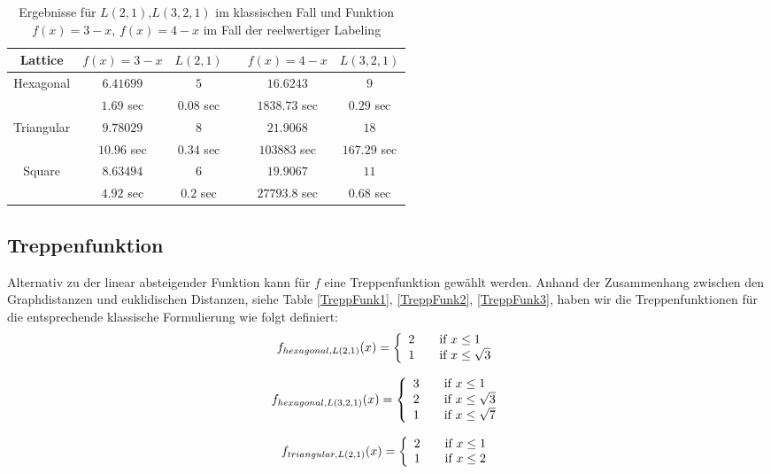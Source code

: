 \documentclass[
	fontsize=12pt,
	paper=a4,
	twoside=false,
	numbers=noenddot,
	plainheadsepline,
	toc=listof,
	toc=bibliography
]{scrartcl}
\begin{document}
\begin{table}[htbp]
\centering
  \begin{tabular}{|c|c|c| c|c|c|}
  \hline Lattice & $f(x) =3-x$  & $L(2,1)$ & & $f(x) =4-x$  & $L(3,2,1)$\\ \hline 
    Hexagonal & $6.41699$ & $5$ & &  $16.6243$ & $9$ \\ 
			& $1.69$ sec & $0.08$ sec& & $1838.73$ sec	& $0.29$ sec\\ \hline
	Triangular & $9.78029$ & $8$ & & $21.9068$ & $18$ \\
			& $10.96$ sec	& $0.34$ sec& & $103883$ sec & $167.29$ sec\\ \hline
    Square	& $8.63494$ & $6$ & & $19.9067$ & $11$ \\
			& $4.92$ sec & $0.2$ sec & & $27793.8$ sec & $0.68$ sec\\
  \hline
  \end{tabular}
\caption{Ergebnisse für  $L(2,1)$,$L(3,2,1)$ im klassischen Fall und Funktion $f(x)=3-x$, $f(x)=4-x$ im Fall der reelwertiger Labeling }
\label{Table:Table1}
\end{table}

\subsection{Treppenfunktion}

Alternativ zu der linear absteigender Funktion kann für $f$ eine Treppenfunktion gewählt werden. Anhand der Zusammenhang zwischen den Graphdistanzen und euklidischen Distanzen,
siehe Table \ref{TreppFunk1}, \ref{TreppFunk2}, \ref{TreppFunk3}, haben wir die Treppenfunktionen für die entsprechende klassische Formulierung wie folgt definiert:
\[ f_{hexagonal,L(2,1)}(x) = \left\{
  \begin{array}{l l}
    2 & \quad \text{if $x\le 1$}\\
    1 & \quad \text{if $x\le \sqrt{3}$}
  \end{array} \right.\]

\[ f_{hexagonal,L(3,2,1)}(x) = \left\{
  \begin{array}{l l}
    3 & \quad \text{if $x\le 1$}\\
    2 & \quad \text{if $x\le \sqrt{3}$}\\
    1 & \quad \text{if $x\le \sqrt{7}$}
  \end{array} \right.\]


\[ f_{triangular,L(2,1)}(x) = \left\{
  \begin{array}{l l}
    2 & \quad \text{if $x\le 1$}\\
    1 & \quad \text{if $x\le 2$}
  \end{array} \right.\]
\end{document}

